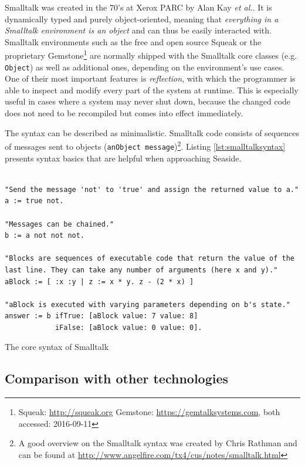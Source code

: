 \documentclass[a4paper,12pt,pagesize,headsepline,bibtotoc,titlepage]{scrartcl}
\begin{document}
Smalltalk was created in the 70's at Xerox PARC by Alan Kay \emph{et al.}. It is dynamically typed and purely object-oriented, meaning that \emph{everything in a Smalltalk environment is an object} and can thus be easily interacted with. Smalltalk environments such as the free and open source Squeak or the proprietary Gemstone\footnote{Squeak: \url{http://squeak.org} Gemstone: \url{https://gemtalksystems.com}, both accessed: 2016-09-11} are normally shipped with the Smalltalk core classes (e.g. \texttt{Object}) as well as additional ones, depending on the environment's use cases. One of their most important features is \emph{reflection}, with which the programmer is able to inspect and modify every part of the system at runtime. This is especially useful in cases where a system may never shut down, because the changed code does not need to be recompiled but comes into effect immediately. 

The syntax can be described as minimalistic. Smalltalk code consists of sequences of messages sent to objects (\texttt{anObject message})\footnote{A good overview on the Smalltalk syntax was created by Chris Rathman and can be found at \url{http://www.angelfire.com/tx4/cus/notes/smalltalk.html}}. Listing \ref{lst:smalltalksyntax} presents syntax basics that are helpful when approaching Seaside.  


\begin{listing}[]%
\begin{verbatim}

"Send the message 'not' to 'true' and assign the returned value to a."
a := true not.

"Messages can be chained."
b := a not not not.

"Blocks are sequences of executable code that return the value of the 
last line. They can take any number of arguments (here x and y)."
aBlock := [ :x :y | z := x * y. z - (2 * x) ]

"aBlock is executed with varying parameters depending on b's state."
answer := b ifTrue: [aBlock value: 7 value: 8] 
            iFalse: [aBlock value: 0 value: 0].

\end{verbatim}
\caption{The core syntax of Smalltalk}
\label{lst:smalltalksyntax}
\end{listing}

\subsection{Comparison with other technologies}
\end{document}
